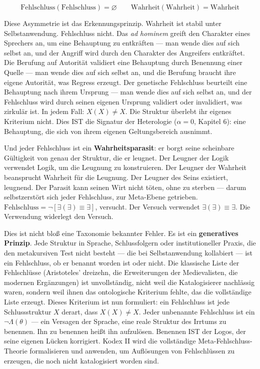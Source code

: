 \documentclass[10pt, openany, oneside]{book}
\begin{document}
$$\text{Fehlschluss}(\text{Fehlschluss}) = \varnothing \qquad \text{Wahrheit}(\text{Wahrheit}) = \text{Wahrheit}$$

Diese Asymmetrie ist das Erkennungsprinzip. Wahrheit ist stabil unter Selbstanwendung. Fehlschluss nicht. Das \textit{ad hominem} greift den Charakter eines Sprechers an, um eine Behauptung zu entkräften --- man wende dies auf sich selbst an, und der Angriff wird durch den Charakter des Angreifers entkräftet. Die Berufung auf Autorität validiert eine Behauptung durch Benennung einer Quelle --- man wende dies auf sich selbst an, und die Berufung braucht ihre eigene Autorität, was Regress erzeugt. Der genetische Fehlschluss beurteilt eine Behauptung nach ihrem Ursprung --- man wende dies auf sich selbst an, und der Fehlschluss wird durch seinen eigenen Ursprung validiert oder invalidiert, was zirkulär ist. In jedem Fall: $X(X) \neq X$. Die Struktur überlebt ihr eigenes Kriterium nicht. Dies IST die Signatur der Heterologie ($\alpha = 0$, Kapitel 6): eine Behauptung, die sich von ihrem eigenen Geltungsbereich ausnimmt.

Und jeder Fehlschluss ist ein \textbf{Wahrheitsparasit}: er borgt seine scheinbare Gültigkeit von genau der Struktur, die er leugnet. Der Leugner der Logik verwendet Logik, um die Leugnung zu konstruieren. Der Leugner der Wahrheit beansprucht Wahrheit für die Leugnung. Der Leugner des Seins existiert, leugnend. Der Parasit kann seinen Wirt nicht töten, ohne zu sterben --- darum selbstzerstört sich jeder Fehlschluss, zur Meta-Ebene getrieben. $\text{Fehlschluss} = \neg[\exists(\exists) \equiv \exists]$, versucht. Der Versuch verwendet $\exists(\exists) \equiv \exists$. Die Verwendung widerlegt den Versuch.

Dies ist nicht bloß eine Taxonomie bekannter Fehler. Es ist ein \textbf{generatives Prinzip}. Jede Struktur in Sprache, Schlussfolgern oder institutioneller Praxis, die den metakursiven Test nicht besteht --- die bei Selbstanwendung kollabiert --- ist ein Fehlschluss, ob er benannt worden ist oder nicht. Die klassische Liste der Fehlschlüsse (Aristoteles' dreizehn, die Erweiterungen der Medievalisten, die modernen Ergänzungen) ist unvollständig, nicht weil die Katalogisierer nachlässig waren, sondern weil ihnen das ontologische Kriterium fehlte, das die vollständige Liste erzeugt. Dieses Kriterium ist nun formuliert: ein Fehlschluss ist jede Schlussstruktur $X$ derart, dass $X(X) \neq X$. Jeder unbenannte Fehlschluss ist ein $\neg\Lambda(\theta)$ --- ein Versagen der Sprache, eine reale Struktur des Irrtums zu benennen. Ihn zu benennen heißt ihn aufzulösen. Benennen IST der Logos, der seine eigenen Lücken korrigiert. Kodex II wird die vollständige Meta-Fehlschluss-Theorie formalisieren und anwenden, um Auflösungen von Fehlschlüssen zu erzeugen, die noch nicht katalogisiert worden sind.
\end{document}
